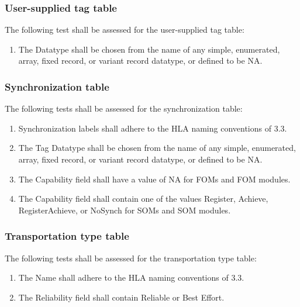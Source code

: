 \subsubsection{User-supplied tag table}
The following test shall be assessed for the user-supplied tag table:
\begin{enumerate}[label=\arabic*),leftmargin=42pt,labelsep=8pt,itemsep=1.2pt,topsep=2pt]
\item The Datatype shall be chosen from the name of any simple, enumerated, array, fixed record, or variant record datatype, or defined to be NA.
\end{enumerate}

\newpage

\subsubsection{Synchronization table}
The following tests shall be assessed for the synchronization table:
\begin{enumerate}[label=\arabic*),leftmargin=42pt,labelsep=8pt,itemsep=1.2pt,topsep=2pt]
\item Synchronization labels shall adhere to the HLA naming conventions of 3.3.
\item The Tag Datatype shall be chosen from the name of any simple, enumerated, array, fixed record, or variant record datatype, or defined to be NA.
\item The Capability field shall have a value of NA for FOMs and FOM modules.
\item The Capability field shall contain one of the values Register, Achieve, RegisterAchieve, or NoSynch for SOMs and SOM modules.
\end{enumerate}

\subsubsection{Transportation type table}
The following tests shall be assessed for the transportation type table:
\begin{enumerate}[label=\arabic*),leftmargin=42pt,labelsep=8pt,itemsep=1.2pt,topsep=2pt]
\item The Name shall adhere to the HLA naming conventions of 3.3.
\item The Reliability field shall contain Reliable or Best Effort.
\end{enumerate}

